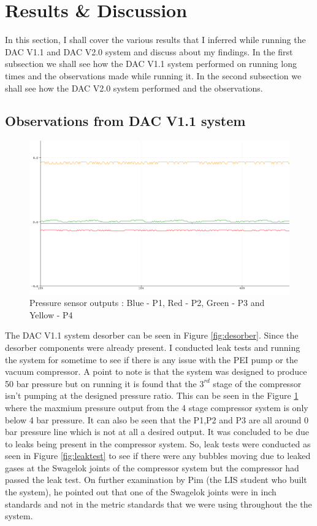 \section{Results \& Discussion }
\label{sec:results}

In this section, I shall cover the various results that I inferred while running the DAC V1.1 and DAC V2.0 system and discuss about my findings. In the first subsection we shall see how the DAC V1.1 system performed on running long times and the observations made while running it. In the second subsection we shall see how the DAC V2.0 system performed and the observations. 

\subsection{Observations from DAC V1.1 system}
\label{sec:dacv1.1obs}

\begin{figure}[H]
    \centering
    \includegraphics{images/mywork/Sprint2/pressuresensor.png}
    \caption{Pressure sensor outputs : Blue - P1, Red - P2, Green - P3 and Yellow - P4}
    \label{fig:psensor}
\end{figure}


The DAC V1.1 system desorber can be seen in Figure \ref{fig:desorber}. Since the desorber components were already present. I conducted leak tests and running the system for sometime to see if there is any issue with the PEI pump or the vacuum compressor. A point to note is that the system was designed to produce 50 bar pressure but on running it is found that the $3^{rd}$ stage of the compressor isn't pumping at the designed pressure ratio. This can be seen in the Figure \ref{fig:psensor} where the maxmium pressure output from the 4 stage compressor system is only below 4 bar pressure. It can also be seen that the P1,P2 and P3 are all around 0 bar pressure line which is not at all a desired output.
\bigbreak 
It was concluded to be due to leaks being present in the compressor system. So, leak tests were conducted as seen in Figure \ref{fig:leaktest} to see if there were any bubbles moving due to leaked gases at the Swagelok joints of the compressor system but the compressor had passed the leak test. On further examination by Pim (the LIS student who built the system), he pointed out that one of the Swagelok joints were in inch standards and not in the metric standards that we were using throughout the the system. 


